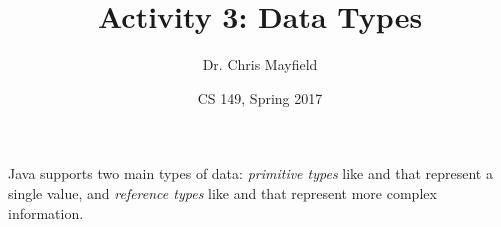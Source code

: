 \documentclass[12pt]{article}
\title{Activity 3: Data Types}
\author{Dr. Chris Mayfield}
\date{CS 149, Spring 2017}
\begin{document}
\maketitle

Java supports two main types of data: \emph{primitive types} like  and  that represent a single value, and \emph{reference types} like  and  that represent more complex information.


\newpage

\newpage

\end{document}
